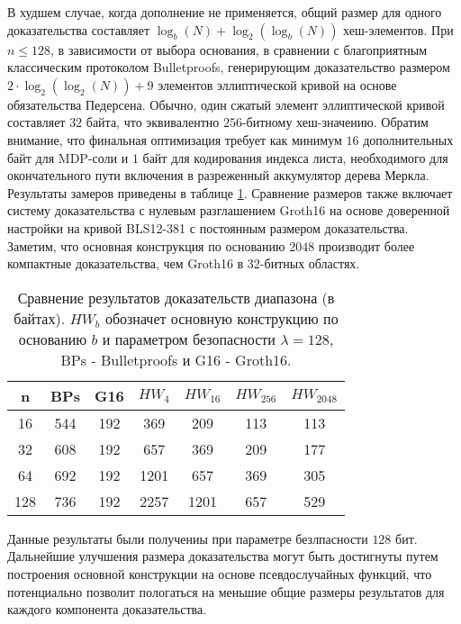 В худшем случае, когда дополнение не применяется, общий размер для одного доказательства составляет $\log_b(N) + \log_2(\log_b(N))$ хеш-элементов.
При $n \leq 128$, в зависимости от выбора основания, в сравнении с благоприятным классическим протоколом Bulletproofs, генерирующим доказательство размером $2 \cdot \log_2(\log_2(N)) + 9$ элементов эллиптической кривой на основе обязательства Педерсена.
Обычно, один сжатый элемент эллиптической кривой составляет $32$ байта, что эквивалентно $256$-битному хеш-значению.
Обратим внимание, что финальная оптимизация требует как минимум $16$ дополнительных байт для MDP-соли и $1$ байт для кодирования индекса листа, необходимого для окончательного пути включения в разреженный аккумулятор дерева Меркла.
Результаты замеров приведены в таблице \ref{table:1}.
Сравнение размеров также включает систему доказательства с нулевым разглашением Groth16 \cite{cryptoeprint:2016/260} на основе доверенной настройки на кривой BLS12-381 с постоянным размером доказательства.
Заметим, что основная конструкция по основанию $2048$ производит более компактные доказательства, чем Groth16 в 32-битных областях.

\begin{table}[h]
	\centering
    \begin{tabular}{|c|c|c|c|c|c|c|}
        \hline
        n   & BPs & G16 & $HW_4$  & $HW_{16}$ & $HW_{256}$ & $HW_{2048}$ \\ \hline
        16  & 544 & 192 & 369     & 209       & 113        & 113         \\ \hline
        32  & 608 & 192 & 657     & 369       & 209        & 177         \\ \hline
        64  & 692 & 192 & 1201    & 657       & 369        & 305         \\ \hline
        128 & 736 & 192 & 2257    & 1201      & 657        & 529         \\ \hline
    \end{tabular}
	\label{table:1}
	\caption{Сравнение результатов доказательств диапазона (в байтах). $HW_b$ обозначет основную конструкцию по основанию $b$ и параметром безопасности $\lambda = 128$, BPs - Bulletproofs и G16 - Groth16.}
\end{table}

Данные результаты были получениы при параметре безлпасности $128$ бит.
Дальнейшие улучшения размера доказательства могут быть достигнуты путем построения основной конструкции на основе псевдослучайных функций, что потенциально позволит пологаться на меньшие общие размеры результатов для каждого компонента доказательства.

